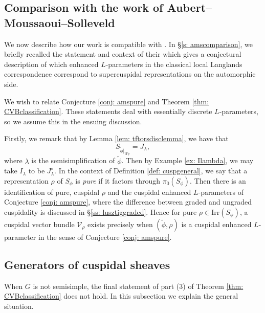 \documentclass{amsart}
\theoremstyle{definition}
\theoremstyle{remark}
\numberwithin{equation}{section}
\newcommand{\mc}{\mathcal}
\newcommand{\Irr}{\mathrm{Irr}}
\begin{document}
\subsection{Comparison with the work of Aubert--Moussaoui--Solleveld}
We now describe how our work is compatible with \cite{AMS1}. In \S\ref{s: amscomparison}, we briefly recalled the statement and context of their \cite[Conjecture 6.10]{AMS1} which gives a conjectural description of which enhanced $L$-parameters in the classical local Langlands correspondence correspond to supercuspidal representations on the automorphic side.

We wish to relate Conjecture \ref{conj: amspure} and Theorem \ref{thm: CVBclassification}. These statements deal with essentially discrete $L$-parameters, so we assume this in the ensuing discussion.

Firstly, we remark that by Lemma \ref{lem: tftorsdisclemma}, we have that
\begin{equation*}
   S_{\tilde{\phi}|_{W_F}} = J_{\lambda}, 
\end{equation*}
where $\lambda$ is the semisimplification of $\tilde{\phi}$. Then by Example \ref{ex: Ilambda}, we may take $I_{\lambda}$ to be $J^{\circ}_{\lambda}$. In the context of Definition \ref{def: cuspgeneral}, we say that a representation $\rho$ of $S_{\phi}
$ is \emph{pure} if it factors through $\pi_0(S_{\phi})$. Then there is an identification of pure, cuspidal $\rho$ and the cuspidal enhanced $L$-parameters of Conjecture \ref{conj: amspure}, where the difference between graded and ungraded cuspidality is discussed in \S \ref{ss: lusztiggraded}. Hence for pure $\rho \in \Irr(S_{\phi})$, a cuspidal vector bundle $\mc{V}_{\rho}$ exists precisely when $(\tilde{\phi}, \rho)$ is a cuspidal enhanced $L$-parameter in the sense of Conjecture \ref{conj: amspure}.
\subsection{Generators of cuspidal sheaves}
When $G$ is not semisimple, the final statement of part (3) of Theorem \ref{thm: CVBclassification} does not hold. In this subsection we explain the general situation.
\end{document}
